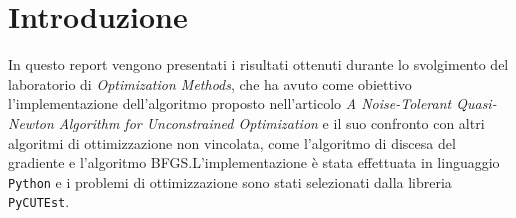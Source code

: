\section{Introduzione}\label{sec:introduzione}
In questo report vengono presentati i risultati ottenuti durante lo svolgimento del laboratorio di \textit{Optimization Methods}, che ha avuto come obiettivo l'implementazione dell'algoritmo proposto nell'articolo \textit{A Noise-Tolerant Quasi-Newton Algorithm for Unconstrained Optimization}\cite{shi2022noise} e il suo confronto con altri algoritmi di ottimizzazione non vincolata, come l'algoritmo di discesa del gradiente e l'algoritmo BFGS.\@ L'implementazione è stata effettuata in linguaggio \texttt{Python} e i problemi di ottimizzazione sono stati selezionati dalla libreria \texttt{PyCUTEst}.